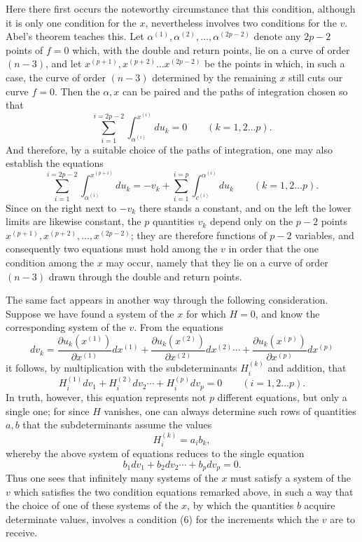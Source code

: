 \documentclass[10pt]{article}
\begin{document}
Here there first occurs the noteworthy circumstance that this condition, although it is only one condition for the \(x\), nevertheless involves two conditions for the \(v\). Abel's theorem teaches this. Let \(\alpha^{(1)},\alpha^{(2)},\ldots,\alpha^{(2p-2)}\) denote any \(2p-2\) points of \(f=0\) which, with the double and return points, lie on a curve of order \((n-3)\), and let \(x^{(p+1)},x^{(p+2)}\ldots x^{(2p-2)}\) be the points in which, in such a case, the curve of order \((n-3)\) determined by the remaining \(x\) still cuts our curve \(f=0\). Then the \(\alpha,x\) can be paired and the paths of integration chosen so that
\[
\sum_{i=1}^{i=2p-2}\int_{\alpha^{(i)}}^{x^{(i)}}du_k=0\qquad (k=1,2\ldots p).
\]
And therefore, by a suitable choice of the paths of integration, one may also establish the equations
\[
\sum_{i=1}^{i=2p-2}\int_{\alpha^{(i)}}^{x^{(p+i)}}du_k=-v_k+\sum_{i=1}^{i=p}\int_{c^{(i)}}^{\alpha^{(i)}}du_k\qquad(k=1,2\ldots p).
\]
Since on the right next to \(-v_k\) there stands a constant, and on the left the lower limits are likewise constant, the \(p\) quantities \(v_k\) depend only on the \(p-2\) points \(x^{(p+1)},x^{(p+2)},\ldots,x^{(2p-2)}\); they are therefore functions of \(p-2\) variables, and consequently two equations must hold among the \(v\) in order that the one condition among the \(x\) may occur, namely that they lie on a curve of order \((n-3)\) drawn through the double and return points.

The same fact appears in another way through the following consideration. Suppose we have found a system of the \(x\) for which \(H=0\), and know the corresponding system of the \(v\). From the equations
\[
dv_k=\frac{\partial u_k(x^{(1)})}{\partial x^{(1)}}dx^{(1)}+\frac{\partial u_k(x^{(2)})}{\partial x^{(2)}}dx^{(2)}\cdots+\frac{\partial u_k(x^{(p)})}{\partial x^{(p)}}dx^{(p)}
\]
it follows, by multiplication with the subdeterminants \(H_i^{(k)}\) and addition, that
\[
H_i^{(1)}dv_1+H_i^{(2)}dv_2\cdots+H_i^{(p)}dv_p=0\qquad(i=1,2\ldots p).
\]
In truth, however, this equation represents not \(p\) different equations, but only a single one; for since \(H\) vanishes, one can always determine such rows of quantities \(a,b\) that the subdeterminants assume the values
\[
H_i^{(k)}=a_i b_k,
\]
whereby the above system of equations reduces to the single equation
\[
\tag{6} b_1dv_1+b_2dv_2\cdots+b_pdv_p=0.
\]
Thus one sees that infinitely many systems of the \(x\) must satisfy a system of the \(v\) which satisfies the two condition equations remarked above, in such a way that the choice of one of these systems of the \(x\), by which the quantities \(b\) acquire determinate values, involves a condition (6) for the increments which the \(v\) are to receive.
\end{document}

